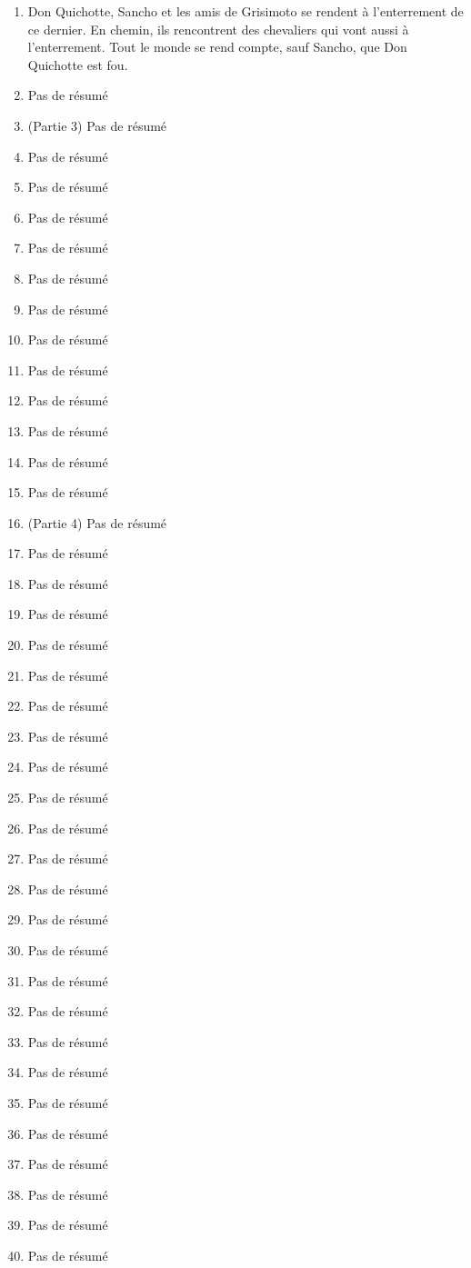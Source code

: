 \documentclass{article}
\begin{document}
\begin{enumerate}
    \item Don Quichotte, Sancho et les amis de Grisimoto se rendent à l'enterrement de ce dernier. En chemin, ils rencontrent des chevaliers qui vont aussi à l'enterrement. Tout le monde se rend compte, sauf Sancho, que Don Quichotte est fou.
    \item Pas de résumé
    \item (Partie 3) Pas de résumé
    \item Pas de résumé
    \item Pas de résumé
    \item Pas de résumé
    \item Pas de résumé
    \item Pas de résumé
    \item Pas de résumé
    \item Pas de résumé
    \item Pas de résumé
    \item Pas de résumé
    \item Pas de résumé
    \item Pas de résumé
    \item Pas de résumé
    \item (Partie 4) Pas de résumé
    \item Pas de résumé
    \item Pas de résumé
    \item Pas de résumé
    \item Pas de résumé
    \item Pas de résumé
    \item Pas de résumé
    \item Pas de résumé
    \item Pas de résumé
    \item Pas de résumé
    \item Pas de résumé
    \item Pas de résumé
    \item Pas de résumé
    \item Pas de résumé
    \item Pas de résumé
    \item Pas de résumé
    \item Pas de résumé
    \item Pas de résumé
    \item Pas de résumé
    \item Pas de résumé
    \item Pas de résumé
    \item Pas de résumé
    \item Pas de résumé
    \item Pas de résumé
    \item Pas de résumé
\end{enumerate}
\end{document}
